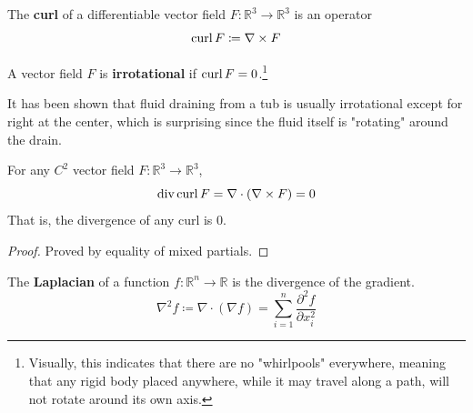   \begin{definition}[Curl]
    \label{def:curl}
		The \textbf{curl} of a differentiable vector field $F: \mathbb{R}^3 \to \mathbb{R}^3$ is an operator
		\begin{equation}
			\operatorname{curl}{F} \coloneqq \nabla \times F
		\end{equation}
  \end{definition}

  \begin{example}
    \label{ex:irrotational-vector-fields}
		A vector field $F$ is \textbf{irrotational} if $\operatorname{curl}{F} = 0$.\footnote{Visually, this indicates that there are no "whirlpools" everywhere, meaning that any rigid body placed anywhere, while it may travel along a path, will not rotate around its own axis. } 
  \end{example}

  It has been shown that fluid draining from a tub is usually irrotational except for right at the center, which is surprising since the fluid itself is "rotating" around the drain. 

	\begin{theorem}
	  \label{thm:curl-fields-have-no-divergence}
		For any $C^2$ vector field $F: \mathbb{R}^3 \to \mathbb{R}^3$, 
		\begin{equation}
			\operatorname{div}{\operatorname{curl}{F}} = \nabla\cdot (\nabla \times F) = 0
		\end{equation}
		That is, the divergence of any curl is 0. 
  \end{theorem}
  \begin{proof}
		Proved by equality of mixed partials. 
  \end{proof}

	\begin{definition}[Laplacian]
	  \label{def:laplacian}
		The \textbf{Laplacian} of a function $f: \mathbb{R}^n \to \mathbb{R}$ is the divergence of the gradient. 
		\begin{equation}
			\nabla^2 f \coloneqq \nabla \cdot (\nabla f) = \sum_{i=1}^n \frac{\partial^2 f}{\partial x_i^2}
		\end{equation}
  \end{definition}

